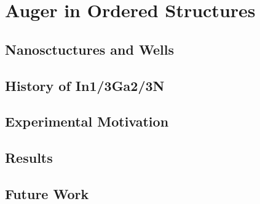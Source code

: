 
\section{Auger in Ordered Structures}\label{auger-in-ordered-structures}

\subsection{Nanosctuctures and Wells}\label{nanosctuctures-and-wells}

\subsection{History of In1/3Ga2/3N}\label{history-of-in13ga23n}

\subsection{Experimental Motivation}\label{experimental-motivation}

\subsection{Results}\label{results}

\subsection{Future Work}\label{future-work}
